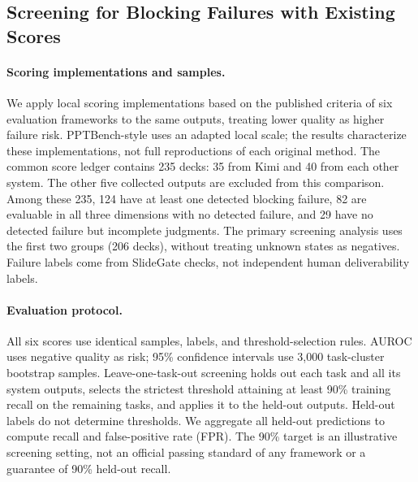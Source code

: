 \subsection{Screening for Blocking Failures with Existing Scores}
\label{sec:screening}
\paragraph{Scoring implementations and samples.}
We apply local scoring implementations based on the published criteria of six evaluation frameworks to the same outputs, treating lower quality as higher failure risk. PPTBench-style uses an adapted local scale; the results characterize these implementations, not full reproductions of each original method. The common score ledger contains 235 decks: 35 from Kimi and 40 from each other system. The other five collected outputs are excluded from this comparison. Among these 235, 124 have at least one detected blocking failure, 82 are evaluable in all three dimensions with no detected failure, and 29 have no detected failure but incomplete judgments. The primary screening analysis uses the first two groups (206 decks), without treating unknown states as negatives. Failure labels come from SlideGate checks, not independent human deliverability labels.

\paragraph{Evaluation protocol.}
All six scores use identical samples, labels, and threshold-selection rules. AUROC uses negative quality as risk; 95\% confidence intervals use 3,000 task-cluster bootstrap samples. Leave-one-task-out screening holds out each task and all its system outputs, selects the strictest threshold attaining at least 90\% training recall on the remaining tasks, and applies it to the held-out outputs. Held-out labels do not determine thresholds. We aggregate all held-out predictions to compute recall and false-positive rate (FPR). The 90\% target is an illustrative screening setting, not an official passing standard of any framework or a guarantee of 90\% held-out recall.

